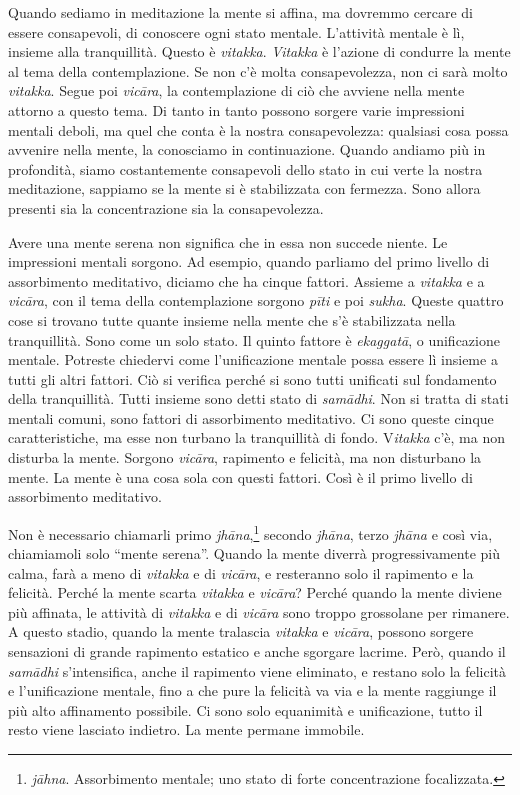 Quando sediamo in meditazione la mente si affina, ma dovremmo cercare di
essere consapevoli, di conoscere ogni stato mentale. L'attività mentale
è lì, insieme alla tranquillità. Questo è \emph{vitakka}. \emph{Vitakka}
è l'azione di condurre la mente al tema della contemplazione. Se non c'è
molta consapevolezza, non ci sarà molto \emph{vitakka}. Segue poi
\emph{vicāra}, la contemplazione di ciò che avviene nella mente attorno
a questo tema. Di tanto in tanto possono sorgere varie impressioni
mentali deboli, ma quel che conta è la nostra consapevolezza: qualsiasi
cosa possa avvenire nella mente, la conosciamo in continuazione. Quando
andiamo più in profondità, siamo costantemente consapevoli dello stato
in cui verte la nostra meditazione, sappiamo se la mente si è
stabilizzata con fermezza. Sono allora presenti sia la concentrazione
sia la consapevolezza.

Avere una mente serena non significa che in essa non succede niente. Le
impressioni mentali sorgono. Ad esempio, quando parliamo del primo
livello di assorbimento meditativo, diciamo che ha cinque fattori.
Assieme a \emph{vitakka} e a \emph{vicāra}, con il tema della
contemplazione sorgono \emph{pīti} e poi \emph{sukha}. Queste quattro
cose si trovano tutte quante insieme nella mente che s'è stabilizzata
nella tranquillità. Sono come un solo stato. Il quinto fattore è
\emph{ekaggatā}, o unificazione mentale. Potreste chiedervi come
l'unificazione mentale possa essere lì insieme a tutti gli altri
fattori. Ciò si verifica perché si sono tutti unificati sul fondamento
della tranquillità. Tutti insieme sono detti stato di \emph{samādhi}.
Non si tratta di stati mentali comuni, sono fattori di assorbimento
meditativo. Ci sono queste cinque caratteristiche, ma esse non turbano
la tranquillità di fondo. V\emph{itakka} c'è, ma non disturba la mente.
Sorgono \emph{vicāra}, rapimento e felicità, ma non disturbano la mente.
La mente è una cosa sola con questi fattori. Così è il primo livello di
assorbimento meditativo.

Non è necessario chiamarli primo \emph{jhāna},\footnote{\emph{jāhna}.
  Assorbimento mentale; uno stato di forte concentrazione focalizzata.}
secondo \emph{jhāna}, terzo \emph{jhāna} e così via, chiamiamoli solo
``mente serena''. Quando la mente diverrà progressivamente più calma,
farà a meno di \emph{vitakka} e di \emph{vicāra}, e resteranno solo il
rapimento e la felicità. Perché la mente scarta \emph{vitakka} e
\emph{vicāra}? Perché quando la mente diviene più affinata, le attività
di \emph{vitakka} e di \emph{vicāra} sono troppo grossolane per
rimanere. A questo stadio, quando la mente tralascia \emph{vitakka} e
\emph{vicāra}, possono sorgere sensazioni di grande rapimento estatico e
anche sgorgare lacrime. Però, quando il \emph{samādhi} s'intensifica,
anche il rapimento viene eliminato, e restano solo la felicità e
l'unificazione mentale, fino a che pure la felicità va via e la mente
raggiunge il più alto affinamento possibile. Ci sono solo equanimità e
unificazione, tutto il resto viene lasciato indietro. La mente permane
immobile.

